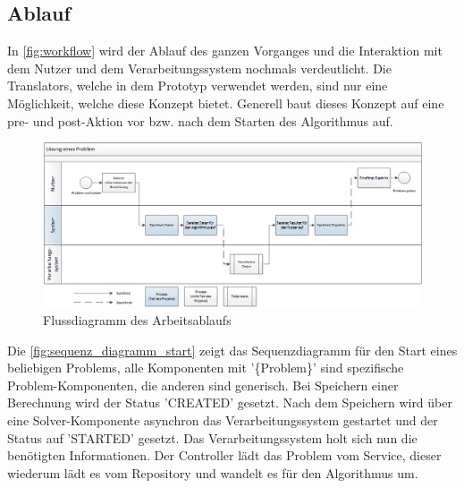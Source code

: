 \begin{landscape}
\subsection{Ablauf}
\thispagestyle{empty}
In \autoref{fig:workflow} wird der Ablauf des ganzen Vorganges und die Interaktion mit dem Nutzer und dem Verarbeitungssystem nochmals verdeutlicht. Die Translators, welche in dem 
Prototyp verwendet werden, sind nur eine Möglichkeit, welche diese Konzept bietet. Generell baut dieses Konzept auf eine pre- und post-Aktion vor bzw. nach dem Starten des Algorithmus 
auf.

\begin{figure}[h]
\centering
\includegraphics[scale=0.8]{images/visio/workflow.png}
\caption[Flussdiagramm des Arbeitsablaufs]{Flussdiagramm des Arbeitsablaufs \selfmade{}}
\label{fig:workflow}
\end{figure}

\end{landscape}

Die \autoref{fig:sequenz_diagramm_start} zeigt das Sequenzdiagramm für den Start eines beliebigen Problems, alle Komponenten mit '\{Problem\}' sind spezifische Problem-Komponenten, 
die anderen sind generisch. Bei Speichern einer Berechnung wird der Status 'CREATED' gesetzt. Nach dem Speichern wird über eine Solver-Komponente asynchron das Verarbeitungssystem 
gestartet und der Status auf 'STARTED' gesetzt. Das Verarbeitungssystem holt sich nun die benötigten Informationen. Der Controller lädt das Problem vom Service, dieser wiederum lädt es vom 
Repository und wandelt es für den Algorithmus um.

